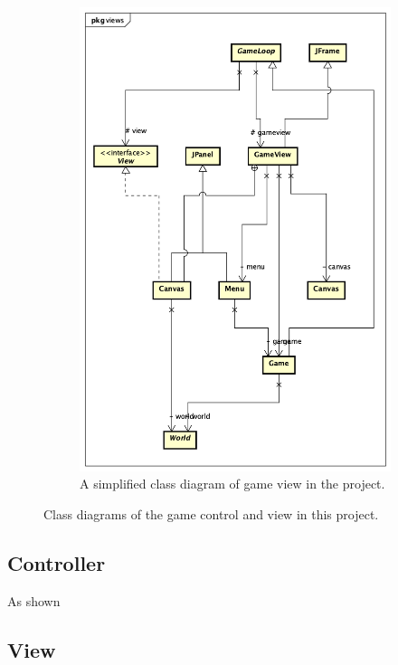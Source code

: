 \begin{figure}[h!]
\begin{subfigure}{.5\textwidth}
  \includegraphics[width=.9\linewidth]{View_Class_Diagram}  
  \caption{A simplified class diagram of game view in the project.}
  \label{fig:sub-second}
\end{subfigure}
\caption{Class diagrams of the game control and view in this project.}
\end{figure}

\subsection{Controller}
As shown 
\subsection{View}





